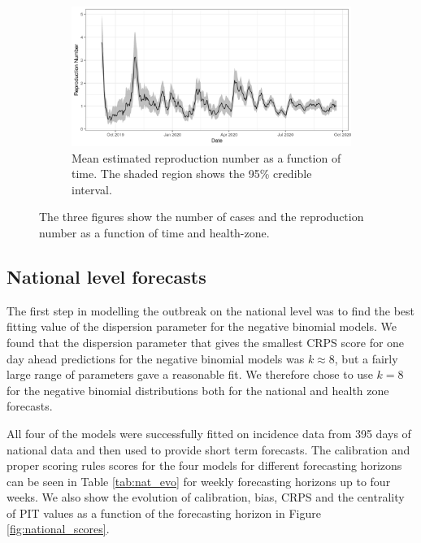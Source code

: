 \documentclass[12pt]{article}
\begin{document}
\begin{figure}[h!]
\bigskip

\begin{subfigure}{\textwidth}
  \centering
  \includegraphics[width=\textwidth]{../output/nat_Rs.png}
  \caption{Mean estimated reproduction number as a function of time. The shaded region shows the 95\% credible interval.}
  \label{fig:rep_num}
\end{subfigure}
\caption{The three figures show the number of cases and the reproduction number as a function of time and health-zone.}
\label{fig:nat_outbreak}
\end{figure}

\subsection{National level forecasts}
The first step in modelling the outbreak on the national level was to find the best fitting value of the dispersion parameter for the negative binomial models. We found that the dispersion parameter that gives the smallest CRPS score for one day ahead predictions for the negative binomial models was $k\approx8$, but a fairly large range of parameters gave a reasonable fit. We therefore chose to use $k=8$ for the negative binomial distributions both for the national and health zone forecasts.

All four of the models were successfully fitted on incidence data from 395 days of national data and then used to provide short term forecasts. The calibration and proper scoring rules scores for the four models for different forecasting horizons can be seen in Table \ref{tab:nat_evo} for weekly forecasting horizons up to four weeks. We also show the evolution of calibration, bias, CRPS and the centrality of PIT values as a function of the forecasting horizon in Figure \ref{fig:national_scores}.

\end{document}
